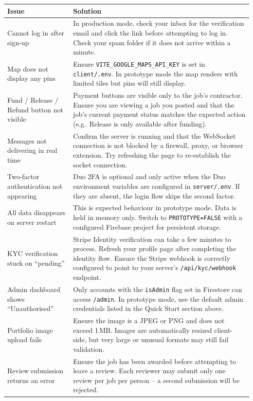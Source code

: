 \documentclass[11pt]{article}
\begin{document}
\begin{longtable}{@{}p{5.2cm}p{8.4cm}@{}}
\toprule
\textbf{Issue} & \textbf{Solution} \\
\midrule
\endhead
Cannot log in after sign-up & In production mode, check your inbox for the verification email and click the link before attempting to log in. Check your spam folder if it does not arrive within a minute. \\
\midrule
Map does not display any pins & Ensure \texttt{VITE\_GOOGLE\_MAPS\_API\_KEY} is set in \texttt{client/.env}. In prototype mode the map renders with limited tiles but pins will still display. \\
\midrule
Fund / Release / Refund button not visible & Payment buttons are visible only to the job's contractor. Ensure you are viewing a job you posted and that the job's current payment status matches the expected action (e.g.\ Release is only available after funding). \\
\midrule
Messages not delivering in real time & Confirm the server is running and that the WebSocket connection is not blocked by a firewall, proxy, or browser extension. Try refreshing the page to re-establish the socket connection. \\
\midrule
Two-factor authentication not appearing & Duo 2FA is optional and only active when the Duo environment variables are configured in \texttt{server/.env}. If they are absent, the login flow skips the second factor. \\
\midrule
All data disappears on server restart & This is expected behaviour in prototype mode. Data is held in memory only. Switch to \texttt{PROTOTYPE=FALSE} with a configured Firebase project for persistent storage. \\
\midrule
KYC verification stuck on ``pending'' & Stripe Identity verification can take a few minutes to process. Refresh your profile page after completing the identity flow. Ensure the Stripe webhook is correctly configured to point to your server's \texttt{/api/kyc/webhook} endpoint. \\
\midrule
Admin dashboard shows ``Unauthorised'' & Only accounts with the \texttt{isAdmin} flag set in Firestore can access \texttt{/admin}. In prototype mode, use the default admin credentials listed in the Quick Start section above. \\
\midrule
Portfolio image upload fails & Ensure the image is a JPEG or PNG and does not exceed 1\,MB. Images are automatically resized client-side, but very large or unusual formats may still fail validation. \\
\midrule
Review submission returns an error & Ensure the job has been awarded before attempting to leave a review. Each reviewer may submit only one review per job per person -- a second submission will be rejected. \\
\bottomrule
\end{longtable}
\end{document}
